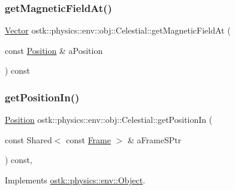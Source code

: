 \subsubsection{\texorpdfstring{get\+Magnetic\+Field\+At()}{getMagneticFieldAt()}}
{\footnotesize\ttfamily \hyperlink{classostk_1_1physics_1_1data_1_1_vector}{Vector} ostk\+::physics\+::env\+::obj\+::\+Celestial\+::get\+Magnetic\+Field\+At (\begin{DoxyParamCaption}\item[{const \hyperlink{classostk_1_1physics_1_1coord_1_1_position}{Position} \&}]{a\+Position }\end{DoxyParamCaption}) const}

\mbox{\label{classostk_1_1physics_1_1env_1_1obj_1_1_celestial_af38fd0017fe14cfb6103684fcb1d3ee9}} 
\subsubsection{\texorpdfstring{get\+Position\+In()}{getPositionIn()}}
{\footnotesize\ttfamily \hyperlink{classostk_1_1physics_1_1coord_1_1_position}{Position} ostk\+::physics\+::env\+::obj\+::\+Celestial\+::get\+Position\+In (\begin{DoxyParamCaption}\item[{const Shared$<$ const \hyperlink{classostk_1_1physics_1_1coord_1_1_frame}{Frame} $>$ \&}]{a\+Frame\+S\+Ptr }\end{DoxyParamCaption}) const\hspace{0.3cm}{\ttfamily [override]}, {\ttfamily [virtual]}}



Implements \hyperlink{classostk_1_1physics_1_1env_1_1_object_a990c33e0cc9e9421488f9fc4cbbf3f21}{ostk\+::physics\+::env\+::\+Object}.

\mbox{\label{classostk_1_1physics_1_1env_1_1obj_1_1_celestial_a4c594d934cf5c6a25795d6a992ea564f}} 
